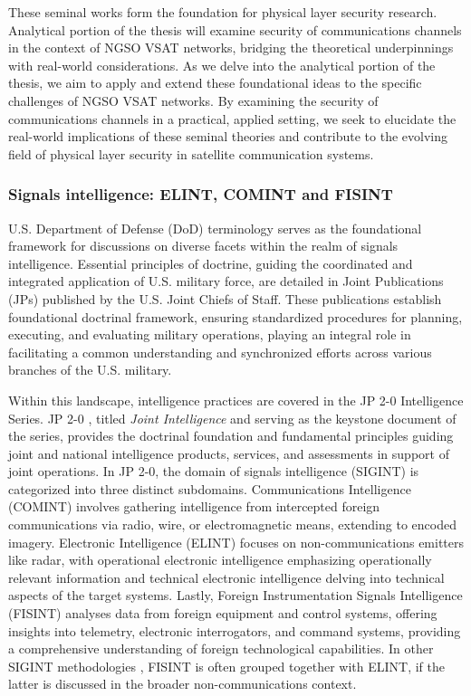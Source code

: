 \documentclass[english, 12pt, a4paper, elec, utf8, a-1b, online]{aaltothesis}
\begin{document}
These seminal works form the foundation for physical layer security research.
Analytical portion of the thesis will examine security of communications channels in the context of NGSO VSAT networks, bridging the theoretical underpinnings with real-world considerations.
As we delve into the analytical portion of the thesis, we aim to apply and extend these foundational ideas to the specific challenges of NGSO VSAT networks.
By examining the security of communications channels in a practical, applied setting, we seek to elucidate the real-world implications of these seminal theories and contribute to the evolving field of physical layer security in satellite communication systems.


\subsubsection{Signals intelligence: ELINT, COMINT and FISINT}
U.S. Department of Defense (DoD) terminology serves as the foundational framework for discussions on diverse facets within the realm of signals intelligence.
Essential principles of doctrine, guiding the coordinated and integrated application of U.S. military force, are detailed in Joint Publications (JPs) published by the U.S. Joint Chiefs of Staff.
These publications establish foundational doctrinal framework, ensuring standardized procedures for planning, executing, and evaluating military operations, playing an integral role in facilitating a common understanding and synchronized efforts across various branches of the U.S. military.

Within this landscape, intelligence practices are covered in the JP 2-0 Intelligence Series.
JP 2-0 \cite{jp2-0}, titled \textit{Joint Intelligence} and serving as the keystone document of the series, provides the doctrinal foundation and fundamental principles guiding joint and national intelligence products, services, and assessments in support of joint operations.
In JP 2-0, the domain of signals intelligence (SIGINT) is categorized into three distinct subdomains. Communications Intelligence (COMINT) involves gathering intelligence from intercepted foreign communications via radio, wire, or electromagnetic means, extending to encoded imagery.
Electronic Intelligence (ELINT) focuses on non-communications emitters like radar, with operational electronic intelligence emphasizing operationally relevant information and technical electronic intelligence delving into technical aspects of the target systems.
Lastly, Foreign Instrumentation Signals Intelligence (FISINT) analyses data from foreign equipment and control systems, offering insights into telemetry, electronic interrogators, and command systems, providing a comprehensive understanding of foreign technological capabilities.
In other SIGINT methodologies \cite{kosola2013digitaalinen}, FISINT is often grouped together with ELINT, if the latter is discussed in the broader non-communications context.
\end{document}
